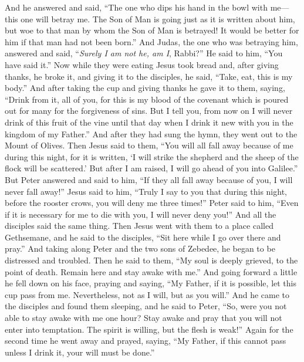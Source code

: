 \begin{biblechapter}
\verse And he answered and said, “The one who dips his hand in the bowl with me—this one will betray me.
\verse The Son of Man is going just as it is written about him, but woe to that man by whom the Son of Man is betrayed! It would be better for him if that man had not been born.”
\verse And Judas, the one who was betraying him, answered and said, “\textit{Surely I am not he, am I}, Rabbi?” He said to him, “You have said it.”
 Now while they were eating Jesus took bread and, after giving thanks, he broke it, and giving it to the disciples, he said, “Take, eat, this is my body.”
\verse And after taking the cup and giving thanks he gave it to them, saying, “Drink from it, all of you,
\verse for this is my blood of the covenant which is poured out for many for the forgiveness of sins.
\verse But I tell you, from now on I will never drink of this fruit of the vine until that day when I drink it new with you in the kingdom of my Father.”
\verse And after they had sung the hymn, they went out to the Mount of Olives.
 Then Jesus said to them, “You will all fall away because of me during this night, for it is written, ‘I will strike the shepherd 
and the sheep of the flock will be scattered.’
\verse But after I am raised, I will go ahead of you into Galilee.”
\verse But Peter answered and said to him, “If they all fall away because of you, I will never fall away!”
\verse Jesus said to him, “Truly I say to you that during this night, before the rooster crows, you will deny me three times!”
\verse Peter said to him, “Even if it is necessary for me to die with you, I will never deny you!” And all the disciples said the same thing.
 Then Jesus went with them to a place called Gethsemane, and he said to the disciples, “Sit here while I go over there and pray.”
\verse And taking along Peter and the two sons of Zebedee, he began to be distressed and troubled.
\verse Then he said to them, “My soul is deeply grieved, to the point of death. Remain here and stay awake with me.”
\verse And going forward a little he fell down on his face, praying and saying, “My Father, if it is possible, let this cup pass from me. Nevertheless, not as I will, but as you will.”
\verse And he came to the disciples and found them sleeping, and he said to Peter, “So, were you not able to stay awake with me one hour?
\verse Stay awake and pray that you will not enter into temptation. The spirit is willing, but the flesh is weak!”
\verse Again for the second time he went away and prayed, saying, “My Father, if this cannot pass unless I drink it, your will must be done.”

\end{biblechapter}
